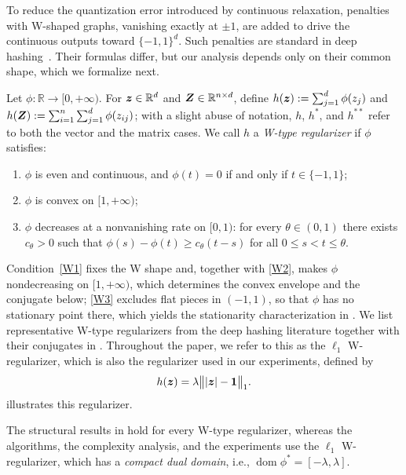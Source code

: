 \begingroup\color{blue}
To reduce the quantization error introduced by continuous relaxation, penalties with W-shaped graphs, vanishing exactly at
$\pm1$, are added to drive the continuous outputs toward $\{-1,1\}^d$. Such penalties
are standard in deep hashing~\cite{liuDeepSupervisedHashing,yuanCentralSimilarityQuantization2020,he2025mambahash,
yin2026crh}. Their formulas differ, but our analysis depends only on their common
shape, which we formalize next.
\begin{definition}\label{def:wtype}
Let \(\phi:\mathbb{R}\to[0,+\infty)\). For \(\bm{z}\in\mathbb{R}^{d}\) and \(\bm{Z}\in\mathbb{R}^{n\times d}\), define \(h(\bm{z}):=\sum_{j=1}^{d}\phi(z_j)\) and \(h(\bm{Z}):=\sum_{i=1}^{n}\sum_{j=1}^{d}\phi(z_{ij})\); with a slight abuse of notation, \(h\), \(h^*\), and \(h^{**}\) refer to both the vector and the matrix cases. We call \(h\) a \emph{W-type regularizer} if \(\phi\) satisfies:
\begin{enumerate}[label=\textup{(W\arabic*)}]
  \item\label{W1} \(\phi\) is even and continuous, and \(\phi(t)=0\) if and only if \(t\in\{-1,1\}\);
  \item\label{W2} \(\phi\) is convex on \([1,+\infty)\);
  \item\label{W3} \(\phi\) decreases at a nonvanishing rate on \([0,1)\): for every \(\theta\in(0,1)\) there exists \(c_{\theta}>0\) such that \(\phi(s)-\phi(t)\ge c_{\theta}(t-s)\) for all \(0\le s<t\le\theta\).
\end{enumerate}
\end{definition}
Condition~\ref{W1} fixes the W shape and, together with \ref{W2}, makes $\phi$ nondecreasing on $[1,+\infty)$, which determines the convex envelope and the conjugate below; \ref{W3} excludes flat pieces in $(-1,1)$, so that $\phi$ has no stationary point there, which yields the stationarity characterization in . We list representative W-type regularizers from the deep hashing literature together with their conjugates in . Throughout the paper, we refer to this as the $\ell_1$ W-regularizer, which is also the regularizer used in our experiments, defined by
\begin{equation}\label{eq:l1-w-regularizer}
h(\bz)=\lambda\bigl\||\bz|-\mathbf{1}\bigr\|_1.
\end{equation} illustrates this regularizer.
\begin{remark}
{The structural results in  hold for every W-type regularizer, whereas the algorithms, the complexity analysis, and the experiments use the $\ell_1$ W-regularizer, which has a \emph{compact dual domain}, i.e., $\operatorname{dom}\phi^*=[-\lambda,\lambda]$.}
\end{remark}

